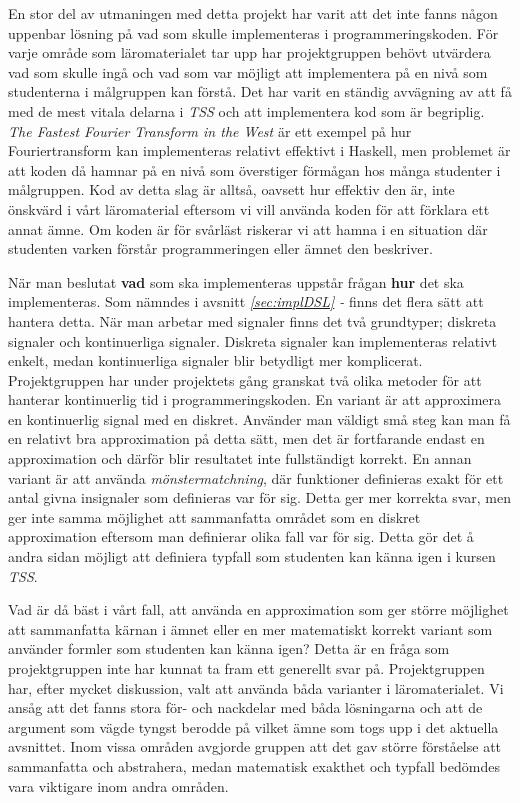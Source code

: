 \documentclass[12pt,a4paper,twoside,openright]{article}
\begin{document}
En stor del av utmaningen med detta projekt har varit att det inte
fanns någon uppenbar lösning på vad som skulle implementeras i
programmeringskoden. För varje område som läromaterialet tar upp har
projektgruppen behövt utvärdera vad som skulle ingå och vad som var
möjligt att implementera på en nivå som studenterna i målgruppen kan
förstå. Det har varit en ständig avvägning av att få med de mest
vitala delarna i \textit{TSS} och att implementera kod som är
begriplig. \textit{The Fastest Fourier Transform in the West}
\cite{fastestfourier} är ett exempel på hur Fouriertransform kan 
implementeras relativt effektivt i Haskell, men problemet är att koden 
då hamnar på en nivå som överstiger förmågan hos många studenter i 
målgruppen. Kod av detta slag är alltså, oavsett hur effektiv den är, 
inte önskvärd i vårt läromaterial eftersom vi vill använda koden för att 
förklara ett annat ämne. Om koden är för svårläst riskerar vi att hamna i en 
situation där studenten varken förstår programmeringen eller ämnet den
beskriver.

När man beslutat \textbf{vad} som ska implementeras uppstår frågan
\textbf{hur} det ska implementeras. Som nämndes i
avsnitt \textit{\ref{sec:implDSL} - }
finns det flera sätt att hantera detta. När man arbetar med signaler
finns det två grundtyper; diskreta signaler och kontinuerliga
signaler. Diskreta signaler kan implementeras relativt enkelt, medan
kontinuerliga signaler blir betydligt mer komplicerat. Projektgruppen
har under projektets gång granskat två olika metoder för att hanterar
kontinuerlig tid i programmeringskoden. En variant är att approximera
en kontinuerlig signal med en diskret. Använder man väldigt små steg
kan man få en relativt bra approximation på detta sätt, men det är
fortfarande endast en approximation och därför blir resultatet inte
fullständigt korrekt.
En annan variant är att använda \textit{mönstermatchning}, där
funktioner definieras exakt för ett antal givna insignaler som
definieras var för sig. Detta ger mer korrekta svar, men ger inte
samma möjlighet att sammanfatta
området som en diskret approximation eftersom man definierar
olika fall var för sig. Detta
gör det å andra sidan möjligt att definiera typfall som
studenten kan känna igen i kursen \textit{TSS}.

Vad är då bäst i vårt fall, att använda en approximation som ger
större möjlighet att %
sammanfatta kärnan i ämnet eller
en mer matematiskt korrekt variant som använder formler som studenten
kan känna igen? Detta är en fråga som projektgruppen inte har kunnat
ta fram ett generellt svar på. Projektgruppen har, efter mycket
diskussion, valt att använda båda varianter i läromaterialet. Vi ansåg
att det fanns stora för- och nackdelar med båda lösningarna och att de
argument som vägde tyngst berodde på vilket ämne som togs upp i det
aktuella avsnittet. Inom vissa områden avgjorde gruppen att det gav
större förståelse att sammanfatta och abstrahera, medan matematisk
exakthet och typfall bedömdes vara viktigare inom andra områden.
\end{document}
